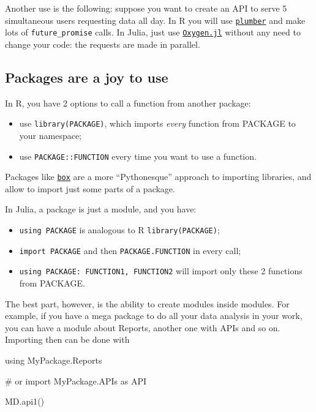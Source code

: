 \documentclass[
  letterpaper,
  DIV=11,
  numbers=noendperiod]{scrartcl}
\newenvironment{Shaded}{\begin{snugshade}}{\end{snugshade}}
\newcommand{\BuiltInTok}[1]{\textcolor[rgb]{0.00,0.23,0.31}{#1}}
\newcommand{\CommentTok}[1]{\textcolor[rgb]{0.37,0.37,0.37}{#1}}
\newcommand{\FunctionTok}[1]{\textcolor[rgb]{0.28,0.35,0.67}{#1}}
\newcommand{\ImportTok}[1]{\textcolor[rgb]{0.00,0.46,0.62}{#1}}
\newcommand{\NormalTok}[1]{\textcolor[rgb]{0.00,0.23,0.31}{#1}}
\providecommand{\tightlist}{%
  \setlength{\itemsep}{0pt}\setlength{\parskip}{0pt}}\usepackage{longtable,booktabs,array}
\begin{document}
Another use is the following: suppose you want to create an API to serve
5 simultaneous users requesting data all day. In R you will use
\href{https://www.rplumber.io/}{\texttt{plumber}} and make lots of
\texttt{future\_promise} calls. In Julia, just use
\href{https://oxygenframework.github.io/Oxygen.jl/stable/\#Multithreading-and-Parallelism}{\texttt{Oxygen.jl}}
without any need to change your code: the requests are made in parallel.

\subsection{Packages are a joy to use}\label{packages-are-a-joy-to-use}

In R, you have 2 options to call a function from another package:

\begin{itemize}
\tightlist
\item
  use \texttt{library(PACKAGE)}, which imports \emph{every} function
  from PACKAGE to your namespace;
\item
  use \texttt{PACKAGE::FUNCTION} every time you want to use a function.
\end{itemize}

Packages like \href{https://klmr.me/box/}{\texttt{box}} are a more
``Pythonesque'' approach to importing libraries, and allow to import
just some parts of a package.

In Julia, a package is just a module, and you have:

\begin{itemize}
\tightlist
\item
  \texttt{using\ PACKAGE} is analogous to R \texttt{library(PACKAGE)};
\item
  \texttt{import\ PACKAGE} and then \texttt{PACKAGE.FUNCTION} in every
  call;
\item
  \texttt{using\ PACKAGE:\ FUNCTION1,\ FUNCTION2} will import only these
  2 functions from PACKAGE.
\end{itemize}

The best part, however, is the ability to create modules inside modules.
For example, if you have a mega package to do all your data analysis in
your work, you can have a module about Reports, another one with APIs
and so on. Importing then can be done with

\begin{Shaded}
\begin{Highlighting}[]
\ImportTok{using} \BuiltInTok{MyPackage.Reports}

\CommentTok{\# or}
\ImportTok{import} \BuiltInTok{MyPackage.APIs}\NormalTok{ as API}

\NormalTok{MD.}\FunctionTok{api1}\NormalTok{()}
\end{Highlighting}
\end{Shaded}
\end{document}
